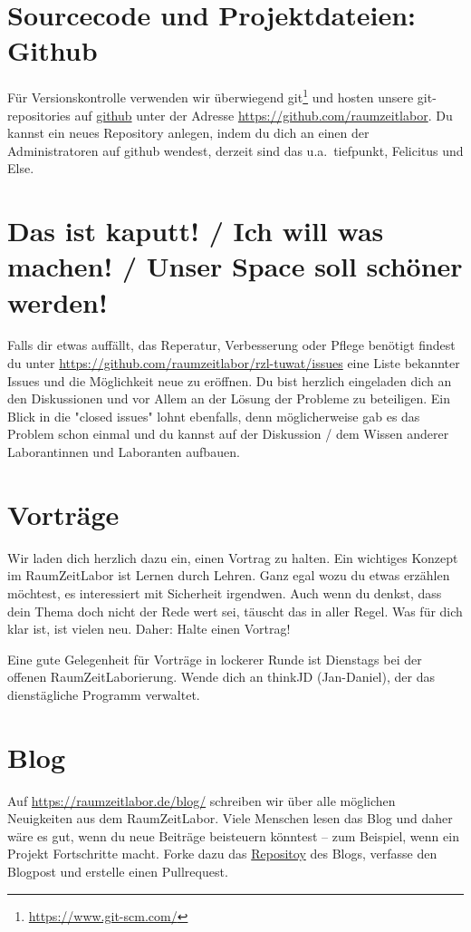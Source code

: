 \documentclass[12pt, DIV16, a4paper]{scrartcl}
\begin{document}
\section*{Sourcecode und Projektdateien: Github}

Für Versionskontrolle verwenden wir überwiegend
git\footnote{\url{https://www.git-scm.com/}} und hosten unsere git-repositories
auf \href{https://github.com/}{github} unter der Adresse
\url{https://github.com/raumzeitlabor}. Du kannst ein neues Repository anlegen,
indem du dich an einen der Administratoren auf github wendest, derzeit sind das
u.a.\ tiefpunkt, Felicitus und Else.

\section*{Das ist kaputt! / Ich will was machen! / Unser Space soll schöner
werden!}
Falls dir etwas auffällt, das Reperatur, Verbesserung oder Pflege benötigt
findest du unter \url{https://github.com/raumzeitlabor/rzl-tuwat/issues} eine
Liste bekannter Issues und die Möglichkeit neue zu eröffnen.
Du bist herzlich eingeladen dich an den
Diskussionen und vor Allem an der Lösung der Probleme zu beteiligen. Ein Blick
in die "closed issues" lohnt ebenfalls, denn möglicherweise gab es das Problem
schon einmal und du kannst auf der Diskussion / dem Wissen anderer
Laborantinnen und Laboranten aufbauen.

\section*{Vorträge}

Wir laden dich herzlich dazu ein, einen Vortrag zu halten. Ein wichtiges
Konzept im RaumZeitLabor ist Lernen durch Lehren. Ganz egal wozu du etwas
erzählen möchtest, es interessiert mit Sicherheit irgendwen. Auch wenn du
denkst, dass dein Thema doch nicht der Rede wert sei, täuscht das in aller
Regel. Was für dich klar ist, ist vielen neu. Daher: Halte einen Vortrag!
\np

Eine gute Gelegenheit für Vorträge in lockerer Runde ist Dienstags bei der
offenen RaumZeitLaborierung. Wende dich an thinkJD (Jan-Daniel), der das
dienstägliche Programm verwaltet.

\section*{Blog}

Auf \url{https://raumzeitlabor.de/blog/} schreiben wir über alle möglichen
Neuigkeiten aus dem RaumZeitLabor. Viele Menschen lesen das Blog und daher wäre
es gut, wenn du neue Beiträge beisteuern könntest -- zum Beispiel, wenn ein
Projekt Fortschritte macht. Forke dazu das
\href{https://github.com/raumzeitlabor/rzl-homepage/}{Repositoy} des Blogs,
verfasse den Blogpost und erstelle einen Pullrequest.
\end{document}
